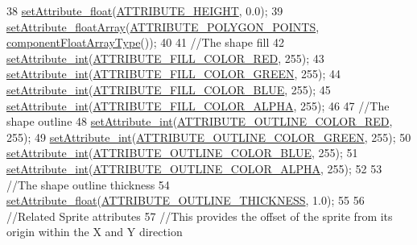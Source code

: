 \begin{DoxyCode}
38     \hyperlink{class_abstract_component_aadaf9dfbb371db5fb21f9c7cf2cbea98}{setAttribute\_float}(\hyperlink{_a_e___attributes_8h_ad1f046fde393a66e7c49f97b08af1c0d}{ATTRIBUTE\_HEIGHT}, 0.0);
39     \hyperlink{class_abstract_component_a8829d475d858bc03e3e3be0e18f18fdb}{setAttribute\_floatArray}(\hyperlink{_a_e___attributes_8h_a26ee781739ac518473cf414ecc968239}{ATTRIBUTE\_POLYGON\_POINTS}, 
      \hyperlink{_abstract_component_8h_a55cf170262c3d7123f8b95208293e36d}{componentFloatArrayType}());
40 
41     \textcolor{comment}{//The shape fill}
42     \hyperlink{class_abstract_component_aca84c14d196467bda6aff90521b1ae7f}{setAttribute\_int}(\hyperlink{_a_e___attributes_8h_a3725edfd1b846140eb49aa34b027b2cb}{ATTRIBUTE\_FILL\_COLOR\_RED}, 255);
43     \hyperlink{class_abstract_component_aca84c14d196467bda6aff90521b1ae7f}{setAttribute\_int}(\hyperlink{_a_e___attributes_8h_a44093150b0166936e44f0748babd201c}{ATTRIBUTE\_FILL\_COLOR\_GREEN}, 255);
44     \hyperlink{class_abstract_component_aca84c14d196467bda6aff90521b1ae7f}{setAttribute\_int}(\hyperlink{_a_e___attributes_8h_a7c1ee03e64d7b6dd251b709f0130cc62}{ATTRIBUTE\_FILL\_COLOR\_BLUE}, 255);
45     \hyperlink{class_abstract_component_aca84c14d196467bda6aff90521b1ae7f}{setAttribute\_int}(\hyperlink{_a_e___attributes_8h_a66939dddc263c09ff273450168b31918}{ATTRIBUTE\_FILL\_COLOR\_ALPHA}, 255);
46 
47     \textcolor{comment}{//The shape outline}
48     \hyperlink{class_abstract_component_aca84c14d196467bda6aff90521b1ae7f}{setAttribute\_int}(\hyperlink{_a_e___attributes_8h_a6b45a750496a3996f9a59fb190c22597}{ATTRIBUTE\_OUTLINE\_COLOR\_RED}, 255);
49     \hyperlink{class_abstract_component_aca84c14d196467bda6aff90521b1ae7f}{setAttribute\_int}(\hyperlink{_a_e___attributes_8h_a63ec6f1bb23064d48d1e9443eae3e36c}{ATTRIBUTE\_OUTLINE\_COLOR\_GREEN}, 255);
50     \hyperlink{class_abstract_component_aca84c14d196467bda6aff90521b1ae7f}{setAttribute\_int}(\hyperlink{_a_e___attributes_8h_a6f224f25c3045b0c0ff6eb9ebfb75b85}{ATTRIBUTE\_OUTLINE\_COLOR\_BLUE}, 255);
51     \hyperlink{class_abstract_component_aca84c14d196467bda6aff90521b1ae7f}{setAttribute\_int}(\hyperlink{_a_e___attributes_8h_a5dc3e53458601ca0d4562198560c6e42}{ATTRIBUTE\_OUTLINE\_COLOR\_ALPHA}, 255);
52 
53     \textcolor{comment}{//The shape outline thickness}
54     \hyperlink{class_abstract_component_aadaf9dfbb371db5fb21f9c7cf2cbea98}{setAttribute\_float}(\hyperlink{_a_e___attributes_8h_ad658dbd44975ac4e266311f3ae29ab00}{ATTRIBUTE\_OUTLINE\_THICKNESS}, 1.0);
55 
56     \textcolor{comment}{//Related Sprite attributes}
57     \textcolor{comment}{//This provides the offset of the sprite from its origin within the X and Y direction}

\end{DoxyCode}
